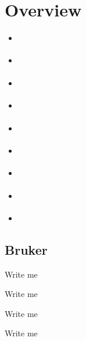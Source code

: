 \documentclass[letterpaper,10pt,english]{sphinxmanual}
\begin{document}
\chapter{Overview}
\label{\detokenize{Sub-Packages:overview}}\label{\detokenize{Sub-Packages::doc}}\begin{itemize}
\item {} 
\sphinxAtStartPar
{\hyperref[\detokenize{Sub-Packages:bruker-module}]{}}

\item {} 
\sphinxAtStartPar
{\hyperref[\detokenize{Sub-Packages:coloring-module}]{}}

\item {} 
\sphinxAtStartPar
{\hyperref[\detokenize{Sub-Packages:event-processing-module}]{}}

\item {} 
\sphinxAtStartPar
{\hyperref[\detokenize{Sub-Packages:io-module}]{}}

\item {} 
\sphinxAtStartPar
{\hyperref[\detokenize{Sub-Packages:image-processing-module}]{}}

\item {} 
\sphinxAtStartPar
{\hyperref[\detokenize{Sub-Packages:interactive-visuals-module}]{}}

\item {} 
\sphinxAtStartPar
{\hyperref[\detokenize{Sub-Packages:reorganization-module}]{}}

\item {} 
\sphinxAtStartPar
{\hyperref[\detokenize{Sub-Packages:signal-processing-module}]{}}

\item {} 
\sphinxAtStartPar
{\hyperref[\detokenize{Sub-Packages:static-visuals-module}]{}}

\end{itemize}


\section{Bruker}
\label{\detokenize{Sub-Packages:bruker}}\label{\detokenize{Sub-Packages:bruker-module}}
\begin{DUlineblock}{0em}
\item[] Write me
\item[] Write me
\item[] Write me
\item[] Write me
\end{DUlineblock}
\end{document}
